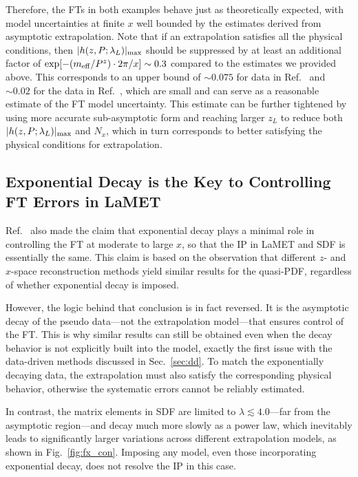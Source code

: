 \documentclass[prd,twocolumn,superscriptaddress,preprintnumbers,showpacs,nofootinbib,notitlepage,floatfix]{revtex4-2}
\DeclareRobustCommand{\fig}[1]{Fig.~\ref{fig:#1}}
\DeclareRobustCommand{\sec}[1]{Sec.~\ref{sec:#1}}
\begin{document}
Therefore, the FTs in both examples behave just as theoretically expected, with model uncertainties at finite $x$ well bounded by the estimates derived from asymptotic extrapolation. Note that if an extrapolation satisfies all the physical conditions, then $|h(z,P;\lambda_L)|_{\rm max}$ should be suppressed by at least an additional factor of $\exp[-(m_{\rm eff}/P^z)\cdot 2\pi/x ]\sim 0.3$ compared to the estimates we provided above. This corresponds to an upper bound of $\sim 0.075$ for data in Ref.~\cite{Dutrieux:2025jed} and $\sim 0.02$ for the data in Ref.~\cite{LatticeParton:2022xsd}, which are small and can serve as a reasonable estimate of the FT model uncertainty. This estimate can be further tightened by using more accurate sub-asymptotic form and reaching larger $z_L$ to reduce both $|h(z,P;\lambda_L)|_{\rm max}$ and $N_x$, which in turn corresponds to better satisfying the physical conditions for extrapolation.

\subsection{Exponential Decay is the Key to Controlling FT Errors in LaMET}
\label{sec:misc}

Ref.~\cite{Dutrieux:2025jed} also made the claim that exponential decay plays a minimal role in controlling the FT at moderate to large $x$, so that the IP in LaMET and SDF is essentially the same. This claim is based on the observation that different $z$- and $x$-space reconstruction methods yield similar results for the quasi-PDF, regardless of whether exponential decay is imposed. 

However, the logic behind that conclusion is in fact reversed. It is the asymptotic decay of the pseudo data---not the extrapolation model---that ensures control of the FT. This is why similar results can still be obtained even when the decay behavior is not explicitly built into the model, exactly the first issue with the data-driven methods discussed in \sec{dd}. To match the exponentially decaying data, the extrapolation must also satisfy the corresponding physical behavior, otherwise the systematic errors cannot be reliably estimated.

In contrast, the matrix elements in SDF are limited to $\lambda \lesssim 4.0$---far from the asymptotic region---and decay much more slowly as a power law, which inevitably leads to significantly larger variations across different extrapolation models, as shown in \fig{fx_con}. Imposing any model, even those incorporating exponential decay, does not resolve the IP in this case.
\end{document}
